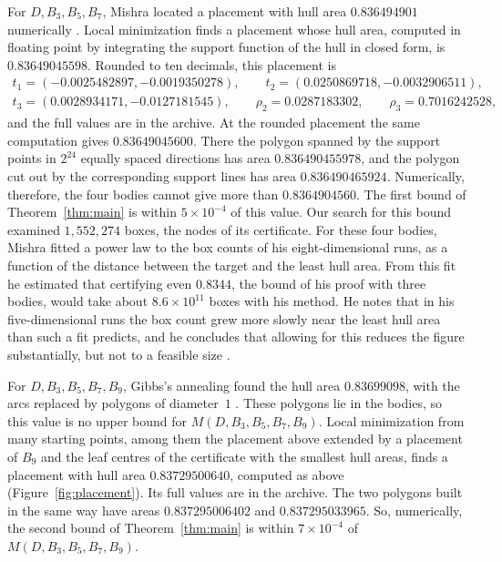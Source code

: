 \documentclass[11pt]{amsart}
\theoremstyle{definition}
\theoremstyle{remark}
\numberwithin{equation}{section}
\newcommand{\NodesFour}{1{,}552{,}274}
\begin{document}
For $D,B_3,B_5,B_7$, Mishra located a placement with hull area $0.836494901$ numerically \cite[Section~6.3]{Mis26}. Local minimization finds a placement whose hull area, computed in floating point by integrating the support function of the hull in closed form, is $0.83649045598$. Rounded to ten decimals, this placement is
\[
\begin{gathered}
t_1=(-0.0025482897,-0.0019350278),\qquad t_2=(0.0250869718,-0.0032906511),\\
t_3=(0.0028934171,-0.0127181545),\qquad\rho_2=0.0287183302,\qquad\rho_3=0.7016242528,
\end{gathered}
\]
and the full values are in the archive. At the rounded placement the same computation gives $0.83649045600$. There the polygon spanned by the support points in $2^{24}$ equally spaced directions has area $0.836490455978$, and the polygon cut out by the corresponding support lines has area $0.836490465924$. Numerically, therefore, the four bodies cannot give more than $0.8364904560$. The first bound of Theorem~\ref{thm:main} is within $5\times10^{-4}$ of this value. Our search for this bound examined $\NodesFour$ boxes, the nodes of its certificate. For these four bodies, Mishra fitted a power law to the box counts of his eight-dimensional runs, as a function of the distance between the target and the least hull area. From this fit he estimated that certifying even $0.8344$, the bound of his proof with three bodies, would take about $8.6\times10^{11}$ boxes with his method. He notes that in his five-dimensional runs the box count grew more slowly near the least hull area than such a fit predicts, and he concludes that allowing for this reduces the figure substantially, but not to a feasible size \cite[Section~6.3]{Mis26}.

For $D,B_3,B_5,B_7,B_9$, Gibbs's annealing found the hull area $0.83699098$, with the arcs replaced by polygons of diameter~$1$ \cite{Gib14}. These polygons lie in the bodies, so this value is no upper bound for $M(D,B_3,B_5,B_7,B_9)$. Local minimization from many starting points, among them the placement above extended by a placement of $B_9$ and the leaf centres of the certificate with the smallest hull areas, finds a placement with hull area $0.83729500640$, computed as above (Figure~\ref{fig:placement}). Its full values are in the archive. The two polygons built in the same way have areas $0.837295006402$ and $0.837295033965$. So, numerically, the second bound of Theorem~\ref{thm:main} is within $7\times10^{-4}$ of $M(D,B_3,B_5,B_7,B_9)$.
\end{document}
